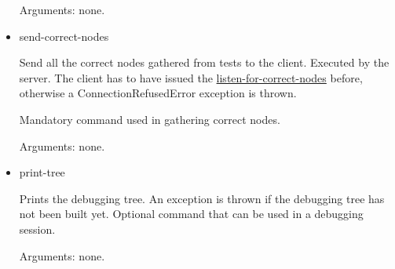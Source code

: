\begin{itemize}
Arguments: none.
\item send-correct-nodes
\label{command:send-correct-nodes}

Send all the correct nodes gathered from tests to the client.
Executed by the server.
The client has to have issued the \hyperref[command:listen-for-correct-nodes]{listen-for-correct-nodes} before, otherwise a ConnectionRefusedError exception is thrown.

Mandatory command used in gathering correct nodes.

Arguments: none.
\item print-tree
\label{command:print-tree}

Prints the debugging tree.
An exception is thrown if the debugging tree has not been built yet.
Optional command that can be used in a debugging session.

Arguments: none.
\end{itemize}

